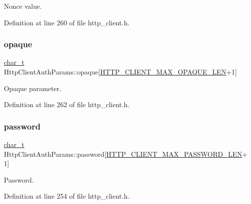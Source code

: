 Nonce value. 



Definition at line 260 of file http\+\_\+client.\+h.

\mbox{\label{structHttpClientAuthParams_ab73141887f9df99f4269f26756b1da4b}} 
\subsubsection{\texorpdfstring{opaque}{opaque}}
{\footnotesize\ttfamily \hyperlink{compiler__port_8h_a40bb5262bf908c328fbcfbe5d29d0201}{char\+\_\+t} Http\+Client\+Auth\+Params\+::opaque\mbox{[}\hyperlink{http__client_8h_a4252661d7fd08be7eec40656551e274f}{H\+T\+T\+P\+\_\+\+C\+L\+I\+E\+N\+T\+\_\+\+M\+A\+X\+\_\+\+O\+P\+A\+Q\+U\+E\+\_\+\+L\+EN}+1\mbox{]}}



Opaque parameter. 



Definition at line 262 of file http\+\_\+client.\+h.

\mbox{\label{structHttpClientAuthParams_a371e3a4a5fabb6c03cef84b43a45f3f2}} 
\subsubsection{\texorpdfstring{password}{password}}
{\footnotesize\ttfamily \hyperlink{compiler__port_8h_a40bb5262bf908c328fbcfbe5d29d0201}{char\+\_\+t} Http\+Client\+Auth\+Params\+::password\mbox{[}\hyperlink{http__client_8h_a33550bf839c313dae49cff95e703b974}{H\+T\+T\+P\+\_\+\+C\+L\+I\+E\+N\+T\+\_\+\+M\+A\+X\+\_\+\+P\+A\+S\+S\+W\+O\+R\+D\+\_\+\+L\+EN}+1\mbox{]}}



Password. 



Definition at line 254 of file http\+\_\+client.\+h.

\mbox{\label{structHttpClientAuthParams_a686fa3d08f2233ab049f6c1fb3a88a76}} 
